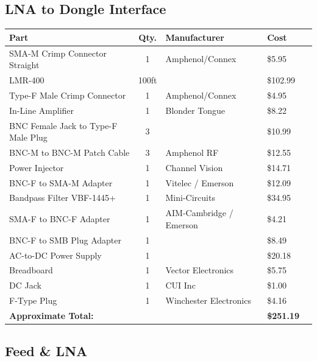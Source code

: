 \documentclass[11pt]{article} %
\begin{document}
\subsection{LNA to Dongle Interface}


\begin{tabular}{| p{6cm} | c | p{5cm} | l | c |}
\hline
\textbf{Part} & \textbf{Qty.} & \textbf{Manufacturer} & \textbf{Cost} \\ \hline \hline
SMA-M Crimp Connector Straight & 1 & Amphenol/Connex & \$5.95 \\ \hline
LMR-400 & 100ft & & \$102.99\\ \hline
Type-F Male Crimp Connector & 1 & Amphenol/Connex &\$4.95 \\ \hline
In-Line Amplifier & 1 & Blonder Tongue & \$8.22 \\ \hline
BNC Female Jack to Type-F Male Plug & 3 & & \$10.99 \\ \hline
BNC-M to BNC-M Patch Cable & 3 & Amphenol RF & \$12.55 \\ \hline
Power Injector & 1 & Channel Vision & \$14.71 \\ \hline
BNC-F to SMA-M Adapter & 1 & Vitelec / Emerson & \$12.09 \\ \hline
Bandpass Filter VBF-1445+ & 1 & Mini-Circuits & \$34.95 \\ \hline
SMA-F to BNC-F Adapter & 1 & AIM-Cambridge / Emerson& \$4.21 \\ \hline
BNC-F to SMB Plug Adapter & 1 & & \$8.49 \\ \hline
AC-to-DC Power Supply & 1 & & \$20.18 \\ \hline
Breadboard & 1 & Vector Electronics & \$5.75 \\ \hline
DC Jack & 1 & CUI Inc & \$1.00 \\ \hline
F-Type Plug & 1 & Winchester Electronics & \$4.16\\ \hline
\textbf{Approximate Total:} & & & \textbf{\$251.19} \\ \hline
\end{tabular}

\subsection{Feed \& LNA}
\end{document}
